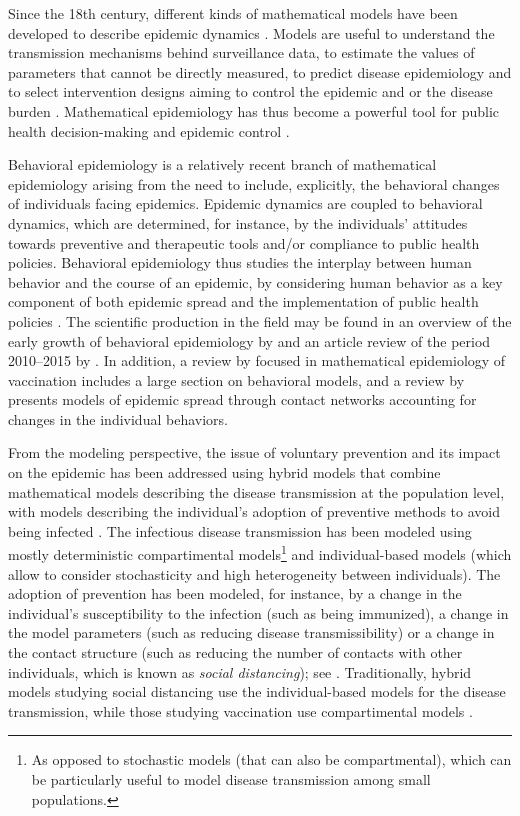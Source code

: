 Since the 18th century, different kinds of mathematical models have been developed to describe epidemic dynamics \cite[]{Brauer2017}. Models are useful to understand the transmission mechanisms behind surveillance data, to estimate the values of parameters that cannot be directly measured, to predict disease epidemiology and to select intervention designs aiming to control the epidemic and or the disease burden \cite[]{Valleron2000}. Mathematical epidemiology has thus become a powerful tool for public health decision-making and epidemic control \cite[]{Valleron2000}. 

Behavioral epidemiology is a relatively recent branch of mathematical epidemiology arising from the need to include, explicitly, the behavioral changes of individuals facing epidemics. Epidemic dynamics are coupled to behavioral dynamics, which are determined, for instance, by the individuals' attitudes towards preventive and therapeutic tools and/or compliance to public health policies. Behavioral epidemiology thus studies the interplay between human behavior and the course of an epidemic, by considering human behavior as a key component of both epidemic spread and the implementation of public health policies \cite[]{Bauch2013}. The scientific production in the field may be found in an overview of the early growth of behavioral epidemiology by \cite{Bauch2013} and an article review of the period 2010--2015 by \cite{Verelst2016}. In addition, a review by \cite{Wang2016} focused in mathematical epidemiology of vaccination includes a large section on behavioral models, and a review by \cite{Wang2015} presents models of epidemic spread through contact networks accounting for changes in the individual behaviors.%

From the modeling perspective, the issue of voluntary prevention and its impact on the epidemic has been addressed using hybrid models that combine mathematical models describing the disease transmission at the population level, with models describing the individual's adoption of preventive methods to avoid being infected \cite[]{Verelst2016}. The infectious disease transmission has been modeled using mostly deterministic compartimental models\footnote{As opposed to stochastic models (that can also be compartmental), which can be particularly useful to model disease transmission among small populations.}  and individual-based models (which allow to consider stochasticity and high heterogeneity between individuals). The adoption of prevention has been modeled, for instance, by a change in the individual's susceptibility to the infection (such as being immunized), a change in the model parameters (such as reducing disease transmissibility) or a change in the contact structure (such as reducing the number of contacts with other individuals, which is known as \textit{social distancing}); see \cite[]{Verelst2016}. Traditionally, hybrid models studying social distancing use the individual-based models for the disease transmission, while those studying vaccination use compartimental models \cite[]{Verelst2016}.

